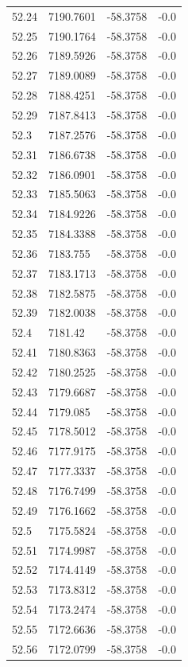 \begin{table}[H]
\begin{tabular}{llll}
52.24 & 7190.7601 & -58.3758 & -0.0 \\
52.25 & 7190.1764 & -58.3758 & -0.0 \\
52.26 & 7189.5926 & -58.3758 & -0.0 \\
52.27 & 7189.0089 & -58.3758 & -0.0 \\
52.28 & 7188.4251 & -58.3758 & -0.0 \\
52.29 & 7187.8413 & -58.3758 & -0.0 \\
52.3 & 7187.2576 & -58.3758 & -0.0 \\
52.31 & 7186.6738 & -58.3758 & -0.0 \\
52.32 & 7186.0901 & -58.3758 & -0.0 \\
52.33 & 7185.5063 & -58.3758 & -0.0 \\
52.34 & 7184.9226 & -58.3758 & -0.0 \\
52.35 & 7184.3388 & -58.3758 & -0.0 \\
52.36 & 7183.755 & -58.3758 & -0.0 \\
52.37 & 7183.1713 & -58.3758 & -0.0 \\
52.38 & 7182.5875 & -58.3758 & -0.0 \\
52.39 & 7182.0038 & -58.3758 & -0.0 \\
52.4 & 7181.42 & -58.3758 & -0.0 \\
52.41 & 7180.8363 & -58.3758 & -0.0 \\
52.42 & 7180.2525 & -58.3758 & -0.0 \\
52.43 & 7179.6687 & -58.3758 & -0.0 \\
52.44 & 7179.085 & -58.3758 & -0.0 \\
52.45 & 7178.5012 & -58.3758 & -0.0 \\
52.46 & 7177.9175 & -58.3758 & -0.0 \\
52.47 & 7177.3337 & -58.3758 & -0.0 \\
52.48 & 7176.7499 & -58.3758 & -0.0 \\
52.49 & 7176.1662 & -58.3758 & -0.0 \\
52.5 & 7175.5824 & -58.3758 & -0.0 \\
52.51 & 7174.9987 & -58.3758 & -0.0 \\
52.52 & 7174.4149 & -58.3758 & -0.0 \\
52.53 & 7173.8312 & -58.3758 & -0.0 \\
52.54 & 7173.2474 & -58.3758 & -0.0 \\
52.55 & 7172.6636 & -58.3758 & -0.0 \\
52.56 & 7172.0799 & -58.3758 & -0.0 \\

\end{tabular}
\end{table}
